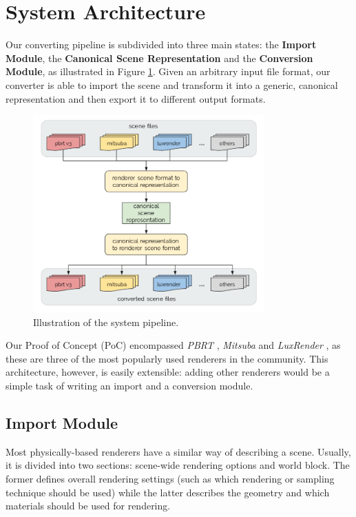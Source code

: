 \section{System Architecture} 
\label{sec:systemarch}

Our converting pipeline is subdivided into three main states: the \textbf{Import
Module}, the \textbf{Canonical Scene Representation} and the \textbf{Conversion
Module}, as illustrated in Figure \ref{fig:sysarch}. Given an arbitrary input
file format, our converter is able to import the scene and transform it into a
generic, canonical representation and then export it to different output
formats.

\begin{figure}[h]
\centering
\includegraphics[width=3.5in]{figs/3_system_architecture/architecture.png}
\caption{Illustration of the system pipeline.}
\label{fig:sysarch}
\end{figure}

Our Proof of Concept (PoC) encompassed \textit{PBRT} \cite{pbrt}, \textit{Mitsuba}
\cite{mitsuba} and \textit{LuxRender} \cite{luxrender}, as these are three of
the most popularly used renderers in the community. This architecture, however,
is easily extensible: adding other renderers would be a simple task of writing
an import and a conversion module.

\subsection{Import Module}
Most physically-based renderers have a similar way of describing a scene.
Usually, it is divided into two sections: scene-wide rendering options and
world block. The former defines overall rendering settings (such as which
rendering or sampling technique should be used) while the latter describes the
geometry and which materials should be used for rendering.


